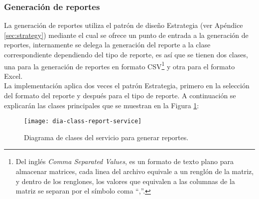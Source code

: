 \subsubsection{Generación de reportes}\label{sec:gen-repport}
La generación de reportes utiliza el patrón de diseño Estrategia (ver Apéndice \ref{sec:strategy}) mediante el cual se ofrece un punto de entrada a la generación de reportes, internamente se delega la generación del reporte a la clase correspondiente dependiendo del tipo de reporte, es así que se tienen dos clases, una para la generación de reportes en formato CSV\footnote{Del inglés \textit{Comma Separated Values}, es un formato de texto plano para almacenar matrices, cada linea del archivo equivale a un renglón de la matriz, y dentro de los renglones, los valores que equivalen a las columnas de la matriz se separan por el símbolo coma ``,''.} y otra para el formato Excel\textsuperscript{\textcopyright}.\\
La implementación aplica dos veces el patrón Estrategia, primero en la selección del formato del reporte y después para el tipo de reporte. A continuación se explicarán las clases principales que se muestran en la Figura \ref{fig:dia-class-report-service}:

\begin{figure}[h]
	\centering
	\texttt{[image: dia-class-report-service]}
	\caption{Diagrama de clases del servicio para generar reportes.}
	\label{fig:dia-class-report-service}
\end{figure}

